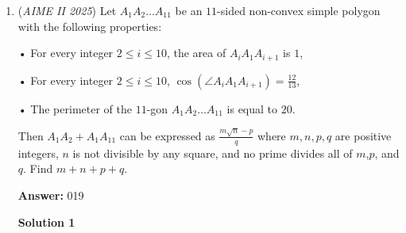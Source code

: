 \begin{enumerate}
 By now one can see the pattern. Consider the hexagon inscribed within the octagon, and it must have its vertices on the odd indices. This doesn't overcount as they aren't relative to any diagonal part of the dodecagon, they are just inscribed within the octagon. We have 9 diagonals.

 Finally, consider the square inscribed in the hexagon, we have 2 diagonals.

 Because the two diagonals of the square are equal, the next polygon cannot be inscribed within the square, and therefore the counting ends here.

 The number of remaining diagonals can all be used to create sets, that satisfy the problem requirements. The number of ways we can construct such sets is the number of remaining diagonals, or $252- 2\cdot 54 - 20 - 9 - 2 =  \boxed{113}$.

 We do not multiply $54+20+9+2$ by 2 because the octagon, hexagon, etc. formed are all uniquely determined not dependent on the dodecagon placement itself, rather on the diagonals of the dodecagon.

 \href{https://mathproblemsolvingskills.wordpress.com/}{MathProblemSolvingSkills.com}

 


 


	\item (\textit{AIME II 2025}) Let $A_1A_2\dots A_{11}$ be an $11$-sided non-convex simple polygon with the following properties:


 • For every integer $2 \leq i \leq 10$, the area of $A_iA_1A_{i+1}$ is $1$,


 • For every integer $2 \leq i \leq 10$, $\cos(\angle A_iA_1A_{i+1})=\frac{12}{13}$,


 • The perimeter of the $11$-gon $A_1A_2\dots A_{11}$ is equal to $20$.


 Then $A_1A_2+A_1A_{11}$ can be expressed as $\frac{m\sqrt{n}-p}{q}$ where $m,n,p,q$ are positive integers, $n$ is not divisible by any square, and no prime divides all of $m$,$p$, and $q$. Find $m+n+p+q$.


 
 \textbf{Answer: }019



\textbf{Solution 1}


\end{enumerate}
